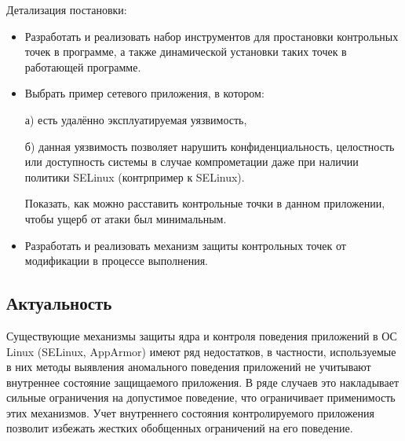 Детализация постановки:
\begin{itemize}
\item Разработать и реализовать набор инструментов для простановки
контрольных точек в программе, а также динамической установки таких
точек в работающей программе.

\item Выбрать пример сетевого приложения, в котором: 

	а) есть удалённо эксплуатируемая уязвимость, 
	
	б) данная уязвимость позволяет нарушить конфиденциальность, 
	целостность или доступность системы в случае компрометации 
	даже при наличии политики SELinux (контрпример к SELinux).

Показать, как можно расставить контрольные точки в данном приложении,
чтобы ущерб от атаки был минимальным.

\item Разработать и реализовать механизм защиты контрольных точек от
модификации в процессе выполнения.

\end{itemize}
\begin{comment}
В работе рассматривается формализованный 
механизм контроля поведения программ, 
используемый в ОС Linux - SELinux.
В задачу входит анализ теоретической базы 
этих механизмов, практический инструментарий
в распространенных дистрибутивах (Debian, 
Ubuntu для AppArmor), достоинства и 
недостатки, в том числе по научной 
литературе. Основная цель данной работы~--- 
повысить гранулярность контроля поведения 
приложений в указанных системах за счет 
отслеживания внутреннего состояния программы 
из ядра. В рамках работы предполагается делать 
это специальной разметкой программы на уровне 
исходных текстов, а также бинарных патчей (хотя 
бы на уровне исследования). Конечная цель~--- 
автоматизация такой разметки по тестам.
\end{comment}

\subsection{Актуальность} 
Существующие механизмы защиты ядра и 
контроля поведения приложений в ОС Linux 
(SELinux, AppArmor) имеют ряд недостатков, 
в частности, используемые в них методы 
выявления аномального поведения приложений 
не учитывают внутреннее состояние защищаемого 
приложения. В ряде случаев это накладывает 
сильные ограничения на допустимое поведение, 
что ограничивает применимость этих механизмов. 
Учет внутреннего состояния контролируемого 
приложения позволит избежать жестких обобщенных 
ограничений на его поведение.

